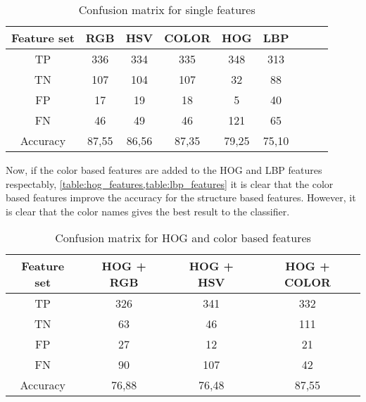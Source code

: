 \FloatBarrier
\begin{table}[h!]
\begin{center}
	\caption{Confusion matrix for single features}
	\begin{tabular}{|c|c|c|c|c|c|c|c|c|}
		\hline
		Feature set &  RGB  &  HSV  & COLOR &  HOG  &  LBP    \\ \hline
		    TP      &  336  &  334  &  335  &  348  &  313    \\ \hline
		    TN      &  107  &  104  &  107  &  32   &  88     \\ \hline
		    FP      &  17   &  19   &  18   &   5   &  40     \\ \hline
		    FN      &  46   &  49   &  46   &  121  &  65     \\ \hline
		 Accuracy   & 87,55 & 86,56 & 87,35 & 79,25 & 75,10   \\ \hline
	\end{tabular}
\label{table:single_feature}
\end{center}
\end{table}
\FloatBarrier

Now, if the color based features are added to the HOG and LBP features respectably, \cref{table:hog_features,table:lbp_features} it is clear that the color based features improve the accuracy for the structure based features. However, it is clear that the color names gives the best result to the classifier. 

\FloatBarrier
\begin{table}[h!]
	\begin{center}
		\caption{Confusion matrix for HOG and color based features}
		\begin{tabular}{|c|c|c|c|}
			\hline
			Feature set & HOG + RGB & HOG + HSV & HOG + COLOR \\ \hline
			    TP      &    326    &    341    &     332     \\ \hline
			    TN      &    63     &    46     &     111     \\ \hline
			    FP      &    27     &    12     &     21      \\ \hline
			    FN      &    90     &    107    &     42      \\ \hline
			 Accuracy   &   76,88   &   76,48   &    87,55    \\ \hline
		\end{tabular}
		
		\label{table:hog_features}
	\end{center}
\end{table}
\FloatBarrier

